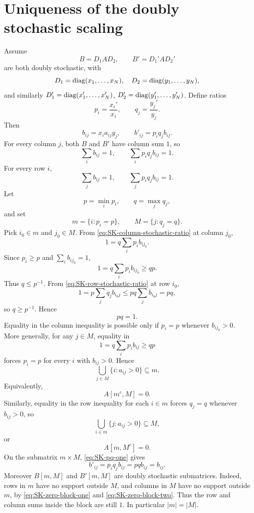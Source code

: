 \section{Uniqueness of the doubly stochastic scaling}
Assume
\[
  B=D_1AD_2,
  \qquad
  B'=D_1'AD_2'
\]
are both doubly stochastic, with
\[
  D_1=\operatorname{diag}(x_1,
\ldots,x_N),\quad
  D_2=\operatorname{diag}(y_1,
\ldots,y_N),
\]
and similarly \(D_1'=\operatorname{diag}(x_1',
\ldots,x_N')\), \(D_2'=\operatorname{diag}(y_1',
\ldots,y_N')\).  Define ratios
\[
  p_i=\frac{x_i'}{x_i},
  \qquad
  q_j=\frac{y_j'}{y_j}.
\]
Then
\[
  b_{ij}=x_i a_{ij}y_j,
  \qquad
  b'_{ij}=p_iq_j b_{ij}.
\]
For every column \(j\), both \(B\) and \(B'\) have column sum \(1\), so
\begin{equation}
  \sum_i b_{ij}=1,
  \qquad
  \sum_i p_iq_j b_{ij}=1.
  \label{eq:SK-column-stochastic-ratio}
\end{equation}
For every row \(i\),
\begin{equation}
  \sum_j b_{ij}=1,
  \qquad
  \sum_j p_iq_j b_{ij}=1.
  \label{eq:SK-row-stochastic-ratio}
\end{equation}
Let
\[
  p=\min_i p_i,
  \qquad
  q=\max_j q_j,
\]
and set
\[
  m=\{i:p_i=p\},
  \qquad
  M=\{j:q_j=q\}.
\]
Pick \(i_0\in m\) and \(j_0\in M\).  From \eqref{eq:SK-column-stochastic-ratio} at column \(j_0\),
\[
  1=q\sum_i p_i b_{ij_0}.
\]
Since \(p_i\ge p\) and \(\sum_i b_{ij_0}=1\),
\[
  1=q\sum_i p_i b_{ij_0}\ge qp.
\]
Thus \(q\le p^{-1}\).  From \eqref{eq:SK-row-stochastic-ratio} at row \(i_0\),
\[
  1=p\sum_j q_j b_{i_0j}\le pq\sum_j b_{i_0j}=pq,
\]
so \(q\ge p^{-1}\).  Hence
\begin{equation}
  pq=1.
  \label{eq:SK-pq-one}
\end{equation}
Equality in the column inequality is possible only if \(p_i=p\) whenever \(b_{ij_0}>0\).  More generally, for any \(j\in M\), equality in
\[
  1=q\sum_i p_i b_{ij}\ge qp
\]
forces \(p_i=p\) for every \(i\) with \(b_{ij}>0\).  Hence
\[
  \bigcup_{j\in M}\{i:a_{ij}>0\}\subseteq m.
\]
Equivalently,
\begin{equation}
  A[m^c,M]=0.
  \label{eq:SK-zero-block-one}
\end{equation}
Similarly, equality in the row inequality for each \(i\in m\) forces \(q_j=q\) whenever \(b_{ij}>0\), so
\[
  \bigcup_{i\in m}\{j:a_{ij}>0\}\subseteq M,
\]
or
\begin{equation}
  A[m,M^c]=0.
  \label{eq:SK-zero-block-two}
\end{equation}
On the submatrix \(m\times M\), \eqref{eq:SK-pq-one} gives
\[
  b'_{ij}=p_iq_jb_{ij}=pqb_{ij}=b_{ij}.
\]
Moreover \(B[m,M]\) and \(B'[m,M]\) are doubly stochastic submatrices.  Indeed, rows in \(m\) have no support outside \(M\), and columns in \(M\) have no support outside \(m\), by \eqref{eq:SK-zero-block-one} and \eqref{eq:SK-zero-block-two}.  Thus the row and column sums inside the block are still \(1\).  In particular \(|m|=|M|\).

